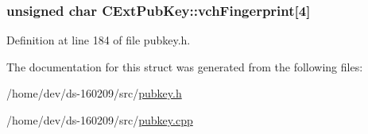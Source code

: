 \subsubsection[{vch\+Fingerprint}]{\setlength{\rightskip}{0pt plus 5cm}unsigned char C\+Ext\+Pub\+Key\+::vch\+Fingerprint\mbox{[}4\mbox{]}}\label{struct_c_ext_pub_key_a57101a84d16d7897bcec224e488143d9}


Definition at line 184 of file pubkey.\+h.



The documentation for this struct was generated from the following files\+:\begin{DoxyCompactItemize}
\item 
/home/dev/ds-\/160209/src/\hyperlink{pubkey_8h}{pubkey.\+h}\item 
/home/dev/ds-\/160209/src/\hyperlink{pubkey_8cpp}{pubkey.\+cpp}\end{DoxyCompactItemize}
